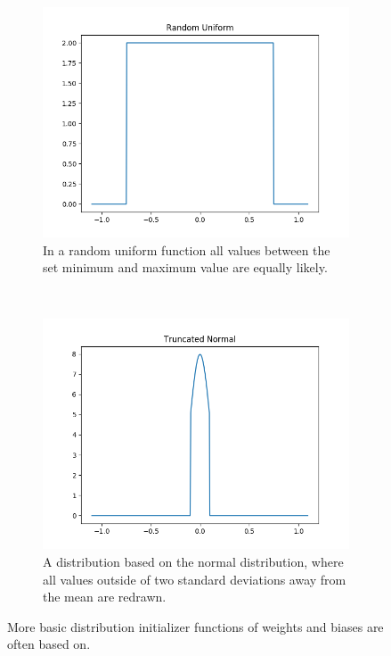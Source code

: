 \newpage

\begin{figure}[h!]
\centering
	\begin{subfigure}[t]{0.5\textwidth}
		\centering
		\includegraphics[width=\textwidth]{img/methodology_neuralNetwork_initializerFunctions_randomUniform.png}
		\caption{In a random uniform function all values between the set minimum and maximum value are equally likely.}
	\end{subfigure}%
	~ 
	\begin{subfigure}[t]{0.5\textwidth}
		\centering
		\includegraphics[width=\textwidth]{img/methodology_neuralNetwork_initializerFunctions_truncatedNormal.png}
		\caption{A distribution based on the normal distribution, where all values outside of two standard deviations away from the mean are redrawn.}
	\end{subfigure}
	\caption{More basic distribution initializer functions of weights and biases are often based on.}
	\label{pic:methodology_neuralNetwork_initializerFunctions2}
\end{figure}

